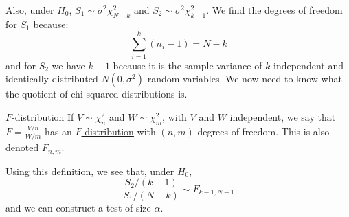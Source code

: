 \documentclass[../Main.tex]{subfiles}
\begin{document}
Also, under $H_0$, $S_1 \sim \sigma^2 \chi_{N-k}^2$ and $S_2 \sim \sigma^2 \chi_{k-1}^2$. We find the degrees of freedom for $S_1$ because:
\begin{equation*}
    \sum_{i=1}^{k} (n_i - 1) = N-k
\end{equation*}
and for $S_2$ we have $k-1$ because it is the sample variance of $k$ independent and identically distributed $N(0, \sigma^2)$ random variables. We now need to know what the quotient of chi-squared distributions is.
\begin{definition}{$F$-distribution}
    If $V \sim \chi_n^2$ and $W\sim\chi_m^2$, with $V$ and $W$ independent, we say that $F = \frac{V/n}{W/m}$ has an \underline{$F$-distribution} with $(n, m)$ degrees of freedom. This is also denoted $F_{n, m}$.
\end{definition}
Using this definition, we see that, under $H_0$,
\begin{equation*}
    \frac{S_2 / (k-1)}{S_1 / (N-k)} \sim F_{k-1, N-1}
\end{equation*}
and we can construct a test of size $\alpha$.
\end{document}
